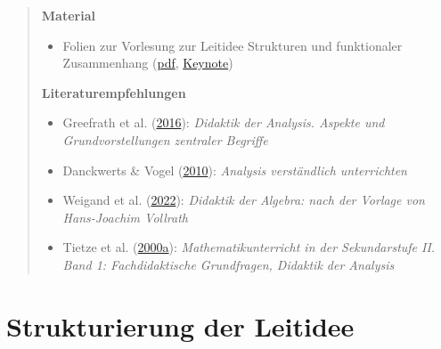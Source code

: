 \documentclass[
]{scrbook}
\providecommand{\tightlist}{%
  \setlength{\itemsep}{0pt}\setlength{\parskip}{0pt}}
\theoremstyle{definition}
\theoremstyle{definition}
\theoremstyle{definition}
\theoremstyle{definition}
\theoremstyle{remark}
\begin{document}
\begin{quote}
\textbf{Material}

\begin{itemize}
\tightlist
\item
  Folien zur Vorlesung zur Leitidee Strukturen und funktionaler Zusammenhang (\href{files/Stoffdidaktik-WiSe2223-Kap13.pdf}{pdf}, \href{files/Stoffdidaktik-WiSe2223-Kap13.key}{Keynote})
\end{itemize}

\textbf{Literaturempfehlungen}

\begin{itemize}
\tightlist
\item
  Greefrath et al. (\protect\hyperlink{ref-Greefrath2016}{2016}): \emph{Didaktik der Analysis. Aspekte und Grundvorstellungen zentraler Begriffe}
\item
  Danckwerts \& Vogel (\protect\hyperlink{ref-Danckwerts2010}{2010}): \emph{Analysis verständlich unterrichten}
\item
  Weigand et al. (\protect\hyperlink{ref-Weigand2022}{2022}): \emph{Didaktik der Algebra: nach der Vorlage von Hans-Joachim Vollrath}
\item
  Tietze et al. (\protect\hyperlink{ref-Tietze:2000a}{2000a}): \emph{Mathematikunterricht in der Sekundarstufe II. Band 1: Fachdidaktische Grundfragen, Didaktik der Analysis}
\end{itemize}
\end{quote}

\hypertarget{strukturierung-der-leitidee-funktionaler-zusammenhang}{%
\section{Strukturierung der Leitidee}\label{strukturierung-der-leitidee-funktionaler-zusammenhang}}
\end{document}
